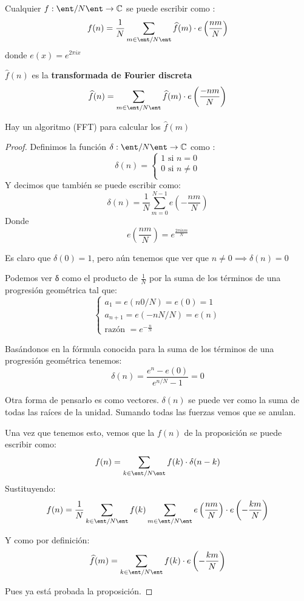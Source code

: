 \begin{theorem}

	Cualquier $f : \ent/N\ent \rightarrow \mathbb{C}$ se puede escribir como :
	$$f(n) = \frac{1}{N}\sum_{m\in \ent/N\ent}\widehat{f}(m)\cdot e\left(\frac{nm}{N}\right)$$
	donde $e(x) = e^{2\pi ix}$

	$\widehat{f}(n)$ es la \textbf{transformada de Fourier discreta}
	$$\widehat{f}(n) = \sum_{m\in \ent/N\ent}\widehat{f}(m)\cdot e\left(\frac{-nm}{N}\right)$$

\end{theorem}
\obs Hay un algoritmo (FFT) para calcular los $\widehat{f}(m)$

\begin{proof}
	Definimos la función $\delta : \ent/N\ent \rightarrow \mathbb{C}$ como :
	$$\delta (n) = \begin{cases}
	1 \text{ si } n=0\\
	0 \text{ si } n\neq 0 \\
	\end{cases}$$
	Y decimos que también se puede escribir como:
	$$\delta (n) = \frac{1}{N} \sum_{m = 0}^{N-1} e\left(-\frac{nm}{N}\right)$$
	Donde
	\[e\left(\frac{nm}{N}\right) = e^{\frac{2\pi inm}{N}}\]

	Es claro que $\delta(0) = 1$, pero aún tenemos que ver que $n\neq 0 \implies \delta (n) = 0$

	Podemos ver δ como el producto de $\frac{1}{N}$ por la suma de los términos de una progresión geométrica tal que:
	\[\begin{cases}
	a_1 = e(n0/N)=e(0)=1\\
	a_{n+1} = e(-nN/N)=e(n)\\
	\text{razón } = e^{-\frac{n}{N}}
	\end{cases}\]

	Basándonos en la fórmula conocida para la suma de los términos de una progresión geométrica tenemos:
	$$\delta (n) =\frac{e^{n} - e(0)}{e^{n/N} - 1} = 0$$

	Otra forma de pensarlo es como vectores. $\delta(n)$ se puede ver como la suma de todas las raíces de la unidad. Sumando todas las fuerzas vemos que se anulan.


	Una vez que tenemos esto, vemos que la $f(n)$ de la proposición se puede escribir como:
	$$f(n) = \sum_{k\in \ent/N\ent} f(k) \cdot \delta(n-k)$$
	Sustituyendo:
	$$f(n) = \frac{1}{N} \sum_{k\in \ent/N\ent} f(k)  \sum_{m \in \ent/N\ent} e\left(\frac{nm}{N}\right) \cdot e\left(- \frac{km}{N}\right)$$

	Y como por definición:
	$$\widehat{f}(m) = \sum_{k\in \ent/N\ent} f(k) \cdot e\left(- \frac{km}{N}\right)$$

	Pues ya está probada la proposición.
\end{proof}
